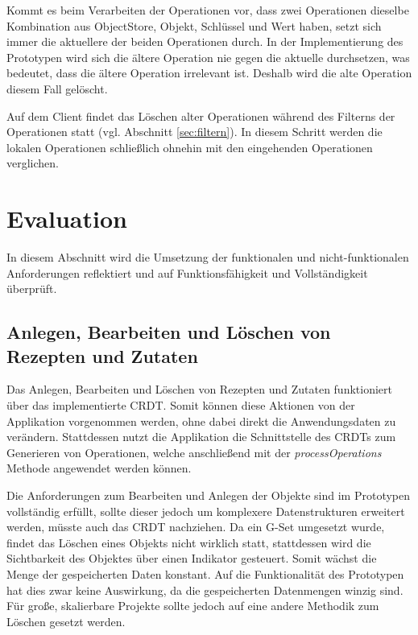 \documentclass[a4paper, 12pt]{scrreprt}
\begin{document}
Kommt es beim Verarbeiten der Operationen vor, dass zwei Operationen dieselbe Kombination aus ObjectStore, Objekt, Schlüssel und Wert haben, setzt sich immer die aktuellere der beiden Operationen durch. In der Implementierung des Prototypen wird sich die ältere Operation nie gegen die aktuelle durchsetzen, was bedeutet, dass die ältere Operation irrelevant ist. Deshalb wird die alte Operation diesem Fall gelöscht. 

Auf dem Client findet das Löschen alter Operationen während des Filterns der Operationen statt (vgl. Abschnitt \ref{sec:filtern}). In diesem Schritt werden die lokalen Operationen schließlich ohnehin mit den eingehenden Operationen verglichen.

\begin{minipage}{\linewidth}
	
\end{minipage}

\chapter{Evaluation}

In diesem Abschnitt wird die Umsetzung der funktionalen und nicht-funktionalen Anforderungen reflektiert und auf Funktionsfähigkeit und Vollständigkeit überprüft.

\section{Anlegen, Bearbeiten und Löschen von Rezepten und Zutaten}
Das Anlegen, Bearbeiten und Löschen von Rezepten und Zutaten funktioniert über das implementierte CRDT. Somit können diese Aktionen von der Applikation vorgenommen werden, ohne dabei direkt die Anwendungsdaten zu verändern. Stattdessen nutzt die Applikation die Schnittstelle des \acp{CRDT} zum Generieren von Operationen, welche anschließend mit der \textit{processOperations} Methode angewendet werden können.

Die Anforderungen zum Bearbeiten und Anlegen der Objekte sind im Prototypen vollständig erfüllt, sollte dieser jedoch um komplexere Datenstrukturen erweitert werden, müsste auch das CRDT nachziehen. Da ein \ac{G-Set} umgesetzt wurde, findet das Löschen eines Objekts nicht wirklich statt, stattdessen wird die Sichtbarkeit des Objektes über einen Indikator gesteuert. Somit wächst die Menge der gespeicherten Daten konstant. Auf die Funktionalität des Prototypen hat dies zwar keine Auswirkung, da die gespeicherten Datenmengen winzig sind. Für große, skalierbare Projekte sollte jedoch auf eine andere Methodik zum Löschen gesetzt werden.
\end{document}
